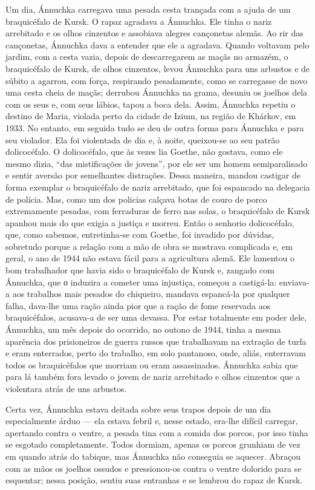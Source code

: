Um dia, Ánnuchka carregava uma pesada cesta trançada com a ajuda de um
braquicéfalo de Kursk. O rapaz agradava a Ánnuchka. Ele tinha o nariz
arrebitado e os olhos cinzentos e assobiava alegres cançonetas alemãs.
Ao rir das cançonetas, Ánnuchka dava a entender que ele a agradava.
Quando voltavam pelo jardim, com a cesta vazia, depois de descarregarem
as maçãs no armazém, o braquicéfalo de Kursk, de olhos cinzentos, levou
Ánnuchka para uns arbustos e de súbito a agarrou, com força, respirando
pesadamente, como se carregasse de novo uma cesta cheia de maçãs;
derrubou Ánnuchka na grama, desuniu os joelhos dela com os seus e, com
seus lábios, tapou a boca dela. Assim, Ánnuchka repetiu o destino de
Maria, violada perto da cidade de Izium, na região de Khárkov, em 1933.
No entanto, em seguida tudo se deu de outra forma para Ánnuchka e para
seu violador. Ela foi violentada de dia e, à noite, queixou-se ao seu
patrão dolicocéfalo. O dolicocéfalo, que às vezes lia Goethe, não
gostava, como ele mesmo dizia, ``das mistificações de jovens'', por ele
ser um homem semiparalisado e sentir aversão por semelhantes distrações.
Dessa maneira, mandou castigar de forma exemplar o braquicéfalo de nariz
arrebitado, que foi espancado na delegacia de polícia. Mas, como um dos
policias calçava botas de couro de porco extremamente pesadas, com
ferraduras de ferro nas solas, o braquicéfalo de Kursk apanhou mais do
que exigia a justiça e morreu. Então o senhorio dolicocéfalo, que, como
sabemos, entretinha-se com Goethe, foi invadido por dúvidas, sobretudo
porque a relação com a mão de obra se mostrava complicada e, em geral, o
ano de 1944 não estava fácil para a agricultura alemã. Ele lamentou o
bom trabalhador que havia sido o braquicéfalo de Kursk e, zangado com
Ánnuchka, que о induzira a cometer uma injustiça, começou a castigá-la:
enviava-a aos trabalhos mais pesados do chiqueiro, mandava espancá-la
por qualquer falha, dava-lhe uma ração ainda pior que a ração de fome
reservada aos braquicéfalos, acusava-a de ser uma devassa. Por estar
totalmente em poder dele, Ánnuchka, um mês depois do ocorrido, no outono
de 1944, tinha a mesma aparência dos prisioneiros de guerra russos que
trabalhavam na extração de turfa e eram enterrados, perto do trabalho,
em solo pantanoso, onde, aliás, enterravam todos os braquicéfalos que
morriam ou eram assassinados. Ánnuchka sabia que para lá também fora
levado o jovem de nariz arrebitado e olhos cinzentos que a violentara
atrás de uns arbustos.

Certa vez, Ánnuchka estava deitada sobre seus trapos depois de um dia
especialmente árduo --- ela estava febril e, nesse estado, era-lhe
difícil carregar, apertando contra o ventre, a pesada tina com a comida
dos porcos, por isso tinha se esgotado completamente. Todos dormiam,
apenas os porcos grunhiam de vez em quando atrás do tabique, mas
Ánnuchka não conseguia se aquecer. Abraçou com as mãos os joelhos
ossudos e pressionou-os contra o ventre dolorido para se esquentar;
nessa posição, sentiu suas entranhas e se lembrou do rapaz de Kursk.

